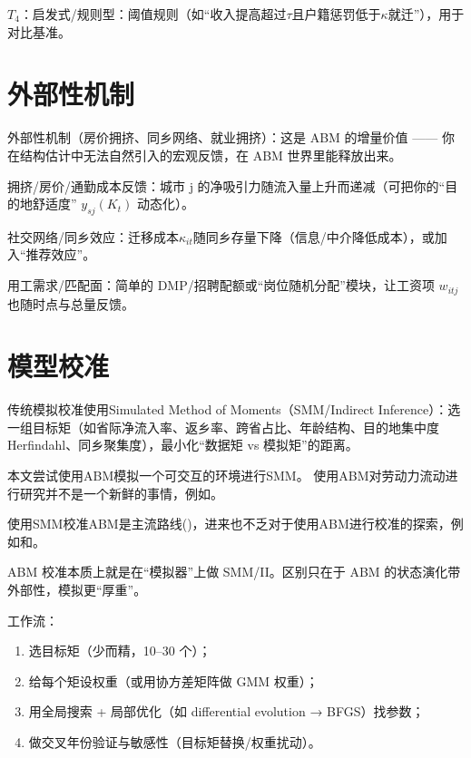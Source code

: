 \documentclass[
  a4paper,
  zihao=-4,
  fontset=mac,
  AutoFakeBold,
  AutoFakeSlant,
  oneside]{ctexbook}
\begin{document}
$T_4$：启发式/规则型：阈值规则（如“收入提高超过$\tau$且户籍惩罚低于$\kappa$就迁”），用于对比基准。





\section{外部性机制} %
\label{sec:外部性机制}

外部性机制（房价拥挤、同乡网络、就业拥挤）：这是 ABM 的增量价值 —— 你在结构估计中无法自然引入的宏观反馈，在 ABM 世界里能释放出来。

拥挤/房价/通勤成本反馈：城市 j 的净吸引力随流入量上升而递减（可把你的“目的地舒适度” $y_{sj}(K_t)$ 动态化）。

社交网络/同乡效应：迁移成本$\kappa_{it}$随同乡存量下降（信息/中介降低成本），或加入“推荐效应”。

用工需求/匹配面：简单的 DMP/招聘配额或“岗位随机分配”模块，让工资项 $w_{itj}$ 也随时点与总量反馈。



\section{模型校准} %
\label{sub:模型校准}





传统模拟校准使用Simulated Method of Moments（SMM/Indirect Inference）：选一组目标矩（如省际净流入率、返乡率、跨省占比、年龄结构、目的地集中度 Herfindahl、同乡聚集度），最小化“数据矩 vs 模拟矩”的距离。

本文尝试使用ABM模拟一个可交互的环境进行SMM。
使用ABM对劳动力流动进行研究并不是一个新鲜的事情，例如\textcite{fuAgentBasedModelingChinas2018,klabundeDecisionmakingAgentbasedModels2016}。

使用SMM校准ABM是主流路线(\textcite{plattComparisonEconomicAgentbased2020})，进来也不乏对于使用ABM进行校准的探索，例如\textcite{rahmandadUsingMethodSimulated2015}和\textcite{pietzschMetamodelsEvaluatingCalibrating2020}。

ABM 校准本质上就是在“模拟器”上做 SMM/II。区别只在于 ABM 的状态演化带外部性，模拟更“厚重”。

工作流：
\begin{enumerate}
\item 选目标矩（少而精，10–30 个）；
\item 给每个矩设权重（或用协方差矩阵做 GMM 权重）；
\item 用全局搜索 + 局部优化（如 differential evolution → BFGS）找参数；
\item 做交叉年份验证与敏感性（目标矩替换/权重扰动）。
\end{enumerate}
\end{document}
